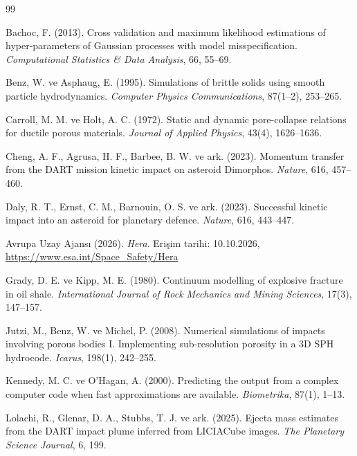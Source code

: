 \documentclass[12pt,a4paper]{article}
\begin{document}
\begin{thebibliography}{99}
\raggedright
\setlength{\itemsep}{0pt}
\setlength{\parsep}{0pt}

Bachoc, F. (2013). Cross validation and maximum likelihood estimations of
hyper-parameters of Gaussian processes with model misspecification.
\emph{Computational Statistics \& Data Analysis}, 66, 55--69.

Benz, W. ve Asphaug, E. (1995). Simulations of brittle solids using smooth
particle hydrodynamics. \emph{Computer Physics Communications}, 87(1--2),
253--265.

Carroll, M. M. ve Holt, A. C. (1972). Static and dynamic pore-collapse
relations for ductile porous materials. \emph{Journal of Applied
Physics}, 43(4), 1626--1636.

Cheng, A. F., Agrusa, H. F., Barbee, B. W. ve ark. (2023). Momentum
transfer from the DART mission kinetic impact on asteroid Dimorphos.
\emph{Nature}, 616, 457--460.

Daly, R. T., Ernst, C. M., Barnouin, O. S. ve ark. (2023). Successful
kinetic impact into an asteroid for planetary defence. \emph{Nature},
616, 443--447.

Avrupa Uzay Ajansı (2026). \emph{Hera}. Erişim tarihi: 10.10.2026,
\url{https://www.esa.int/Space_Safety/Hera}

Grady, D. E. ve Kipp, M. E. (1980). Continuum modelling of explosive
fracture in oil shale. \emph{International Journal of Rock Mechanics and
Mining Sciences}, 17(3), 147--157.

Jutzi, M., Benz, W. ve Michel, P. (2008). Numerical simulations of
impacts involving porous bodies I. Implementing sub-resolution porosity
in a 3D SPH hydrocode. \emph{Icarus}, 198(1), 242--255.

Kennedy, M. C. ve O'Hagan, A. (2000). Predicting the output from a
complex computer code when fast approximations are available.
\emph{Biometrika}, 87(1), 1--13.

Lolachi, R., Glenar, D. A., Stubbs, T. J. ve ark. (2025). Ejecta mass
estimates from the DART impact plume inferred from LICIACube images.
\emph{The Planetary Science Journal}, 6, 199.


\end{thebibliography}
\end{document}
